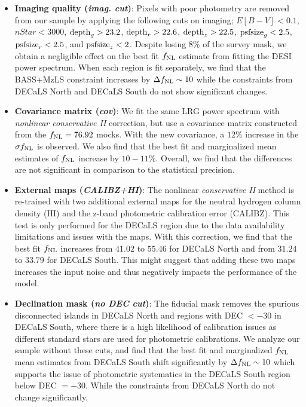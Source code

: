\begin{itemize}
\item \textbf{Imaging quality (\textit{imag. cut})}: Pixels with poor photometry are removed from our sample by applying the following cuts on imaging; $E[B-V]<0.1$, $nStar < 3000$, ${\rm depth}_{g} > 23.2$, ${\rm depth}_{r} > 22.6$, ${\rm depth}_{z} > 22.5$, ${\rm psfsize}_{g}<2.5$, ${\rm psfsize}_{r}<2.5$, and ${\rm psfsize}_{z}<2$. Despite losing $8\%$ of the survey mask, we obtain a negligible effect on the best fit $f_{\rm NL}$ estimate from fitting the DESI power spectrum. When each region is fit separately, we find that the BASS+MzLS constraint increases by $\Delta f_{\rm NL} \sim 10$ while the constraints from DECaLS North and DECaLS South do not show significant changes. 

\item \textbf{Covariance matrix (\textit{cov})}: We fit the same LRG power spectrum with \textit{nonlinear conservative II} correction, but use a covariance matrix constructed from the $f_{\rm NL}=76.92$ mocks. With the new covariance, a $12\%$ increase in the $\sigma f_{\rm NL}$ is observed. We also find that the best fit and marginalized mean estimates of $f_{\rm NL}$ increase by $10-11\%$. Overall, we find that the differences are not significant in comparison to the statistical precision.

\item \textbf{External maps (\textit{CALIBZ+HI})}: The nonlinear \textit{conservative II} method is re-trained with two additional external maps for the neutral hydrogen column density (HI) and the z-band photometric calibration error (CALIBZ). This test is only performed for the DECaLS region due to the data availability limitations and issues with the maps. With this correction, we find that the best fit $f_{\rm NL}$ increases from $41.02$ to $55.46$ for DECaLS North and from $31.24$ to $33.79$ for DECaLS South. This might suggest that adding these two maps increases the input noise and thus negatively impacts the performance of the model.

\item \textbf{Declination mask (\textit{no DEC cut})}: The fiducial mask removes the spurious disconnected islands in DECaLS North and regions with DEC $<-30$ in DECaLS South, where there is a high likelihood of calibration issues as different standard stars are used for photometric calibrations. We analyze our sample without these cuts, and find that the best fit and marginalized $f_{\rm NL}$ mean estimates from DECaLS South shift significantly by $\Delta f_{\rm NL} \sim 10$ which supports the issue of photometric systematics in the DECaLS South region below DEC $=-30$. While the constraints from DECaLS North do not change significantly.


\end{itemize}
